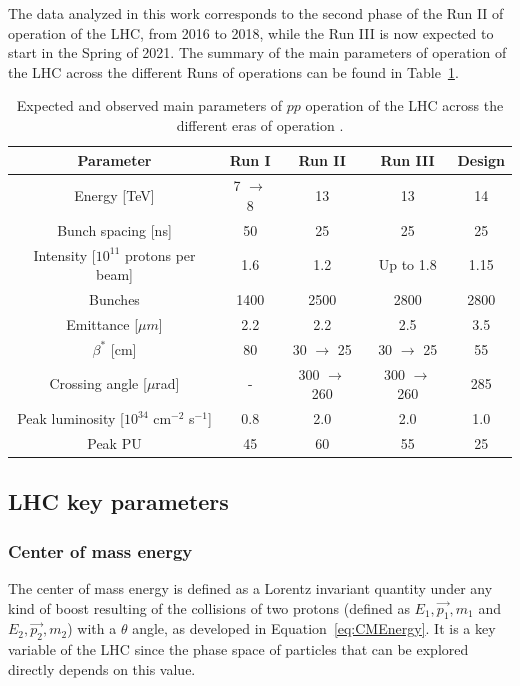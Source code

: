 \documentclass[a4paper, 10pt, openright]{report}
\begin{document}
The data analyzed in this work corresponds to the second phase of the Run II of operation of the \ac{LHC}, from 2016 to 2018, while the Run III is now expected to start in the Spring of 2021. The summary of the main parameters of operation of the \ac{LHC} across the different Runs of operations can be found in Table~\ref{table:LHCRuns}.

\begin{table}
\begin{center}
\begin{tabular}{ c|c|c|c|c } 
 \hline
 Parameter & Run I & Run II & Run III & Design \\
\hline
Energy [TeV] & 7 $\rightarrow$ 8 & 13 & 13 & 14 \\
Bunch spacing [ns] & 50 & 25 & 25 & 25 \\
Intensity [$10^{11}$ protons per beam] & 1.6 & 1.2 & Up to 1.8 & 1.15 \\
Bunches & 1400 & 2500 & 2800 & 2800 \\
Emittance [$\mu m$] & 2.2 & 2.2 & 2.5 & 3.5 \\
$\beta^*$ [cm] & 80 & 30 $\rightarrow$ 25 & 30 $\rightarrow$ 25 & 55 \\
Crossing angle [$\mu$rad] & - & 300 $\rightarrow$ 260 & 300 $\rightarrow$ 260 & 285 \\
Peak luminosity [$10^{34}$ cm$^{-2}$ s$^{-1}$] & 0.8 & 2.0 & 2.0 & 1.0 \\
Peak \ac{PU} & 45 & 60 & 55 & 25 \\
 \hline
\end{tabular}
\caption{ Expected and observed main parameters of $pp$ operation of the \ac{LHC} across the different eras of operation \cite{LHCRuns}.}
\label{table:LHCRuns}
\end{center}
\end{table}

\subsection{\ac{LHC} key parameters}\label{section:LHCParams}

\subsubsection{Center of mass energy} \label{subsection:CMEnergy}

The center of mass energy is defined as a Lorentz invariant quantity under any kind of boost resulting of the collisions of two protons (defined as $E_1, \overrightarrow{p_1}, m_1$ and $E_2, \overrightarrow{p_2}, m_2$) with a $\theta$ angle, as developed in Equation~\ref{eq:CMEnergy}. It is a key variable of the \ac{LHC} since the phase space of particles that can be explored directly depends on this value.
\end{document}
